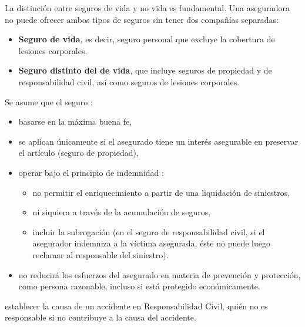 \begin{f}
	
La distinción entre seguros de vida y no vida es fundamental. Una aseguradora no puede ofrecer ambos tipos de seguros sin tener dos compañías separadas: 
\begin{itemize}
	\item \textbf{Seguro de vida}, es decir, seguro personal que excluye la cobertura de lesiones corporales.
	\item \textbf{Seguro distinto del de vida}, que incluye seguros de propiedad y de responsabilidad civil, así como seguros de lesiones corporales.
\end{itemize}
\end{f}


\begin{f}
	
	
Se asume que el seguro :
	\begin{itemize}
		\item basarse en la máxima buena fe,
		\item se aplican únicamente si el asegurado tiene un interés asegurable en preservar el artículo (seguro de propiedad),
		\item operar bajo el principio de indemnidad : 
		\begin{itemize}
			\item no permitir el enriquecimiento a partir de una liquidación de siniestros,
			\item ni siquiera a través de la acumulación de seguros, 
			\item incluir la subrogación (en el seguro de responsabilidad civil, si el asegurador indemniza a la víctima asegurada, éste no puede luego reclamar al responsable del siniestro). 
		\end{itemize}
		\item no reducirá los esfuerzos del asegurado en materia de prevención y protección, como persona razonable, incluso si está protegido económicamente.
	\end{itemize}
	\item establecer la causa de un accidente en Responsabilidad Civil, quién no es responsable si no contribuye a la causa del accidente.
\end{f}


